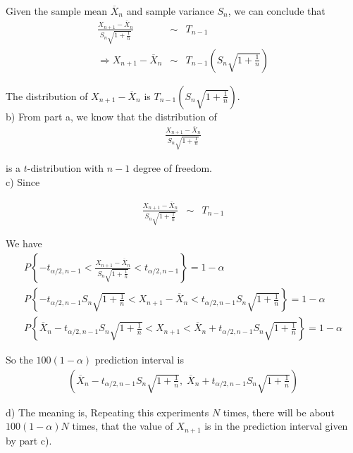 \documentclass[12pt]{article}
\begin{document}
Given the sample mean $\overline{X}_n$ and sample variance $S_n$, we can conclude that
\begin{eqnarray*}
  \frac{X_{n+1} - \overline{X}_n}{S_n \sqrt{1 + \frac{1}{n}}}
  &\sim& T_{n-1} \\
  \Rightarrow   X_{n+1} - \overline{X}_n
  &\sim& T_{n-1} \left( S_n \sqrt{1 + \frac{1}{n}} \right)
\end{eqnarray*}

The distribution of $X_{n+1} - \overline{X}_n$ is $T_{n-1} \left( S_n \sqrt{1 + \frac{1}{n}} \right)$. \\

b) From part a, we know that the distribution of
\begin{eqnarray*}
  \frac{X_{n+1} - \overline{X}_n}{S_n \sqrt{1 + \frac{1}{n}}}
\end{eqnarray*}

is a $t$-distribution with $n-1$ degree of freedom. \\

c) Since

\begin{eqnarray*}
  \frac{X_{n+1} - \overline{X}_n}{S_n \sqrt{1 + \frac{1}{n}}}
  &\sim& T_{n-1}
\end{eqnarray*}

We have
\begin{eqnarray*}
  P \left\{ - t_{\alpha/2, n-1} <
    \frac{X_{n+1} - \overline{X}_n}{S_n \sqrt{1 + \frac{1}{n}}}
    < t_{\alpha/2, n-1}
  \right\} = 1 - \alpha \\
  P \left\{ - t_{\alpha/2, n-1} S_n \sqrt{1 + \frac{1}{n}} <
    X_{n+1} - \overline{X}_n
    < t_{\alpha/2, n-1} S_n \sqrt{1 + \frac{1}{n}}
  \right\} = 1 - \alpha \\
  P \left\{ \overline{X}_n - t_{\alpha/2, n-1} S_n \sqrt{1 + \frac{1}{n}}
    < X_{n+1} < \overline{X}_n + t_{\alpha/2, n-1} S_n \sqrt{1 + \frac{1}{n}}
  \right\} = 1 - \alpha
\end{eqnarray*}

So the $100(1-\alpha)$ prediction interval is
\begin{eqnarray*}
  \left( \overline{X}_n - t_{\alpha/2, n-1}
    S_n \sqrt{1 + \frac{1}{n}}, \;
    \overline{X}_n + t_{\alpha/2, n-1}
    S_n \sqrt{1 + \frac{1}{n}} \right)
\end{eqnarray*}

d) The meaning is, Repeating this experiments $N$ times, there will be about $100(1 - \alpha)N$ times, that the value of $X_{n+1}$ is in the prediction interval given by part c). \\
\end{document}
